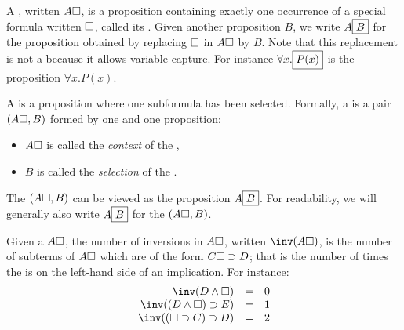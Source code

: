 
\begin{scope}

\begin{definition}[Context]\label{def:formula-context}

  A , written $A\square$, is a proposition containing exactly one
  occurrence of a special formula written $\square$, called its .
  Given another proposition $B$, we write $A\fbox{$B$}$ for the proposition
  obtained by replacing $\square$ in $A\square$ by $B$. Note that this replacement
  is not a  because it allows variable capture. For instance
  $\forall x.\fbox{$P(x)$}$ is the proposition $\forall x.P(x)$.
\end{definition}

\begin{definition}[Path]\label{def:path}
A  is a proposition where one subformula has been
selected. Formally, a  is a pair $(A\square, B)$ formed by one
 and one proposition:
\begin{itemize}
\item $A\square$ is called the {\em context} of the ,
\item $B$ is called the {\em selection} of the .
\end{itemize}

The  $(A\square, B)$ can be viewed as the proposition
$A\fbox{$B$}$.  For readability, we will generally also write
$A\fbox{$B$}$ for the  $(A\square, B)$.
\end{definition}

\begin{definition}[Inversions]
  Given a  $A\square$, the number of inversions in $A\square$,
  written $\inv(A\hole)$, is the number of subterms of $A\square$
  which are of the form $C\square\supset D$; that is the number of
  times the  is on the left-hand side of an implication.
  For instance:
  $$
  \begin{array}{rcl}
      \inv(D\land \hole)&=& 0\\
      \inv((D\land \hole)\limp E)&=&1\\
      \inv((\hole\limp C)\limp D) &=& 2
  \end{array}
  $$
\end{definition}


\end{scope}
